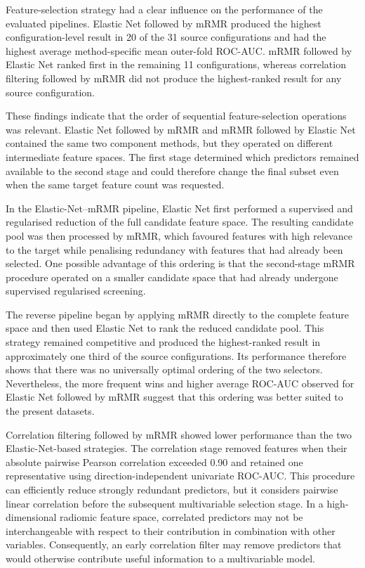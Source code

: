 \documentclass[12pt,twocolumn]{article}
\begin{document}
Feature-selection strategy had a clear influence on the performance
of the evaluated pipelines. Elastic Net followed by mRMR produced the
highest configuration-level result in 20 of the 31 source
configurations and had the highest average method-specific mean
outer-fold ROC-AUC. mRMR followed by Elastic Net ranked first in the
remaining 11 configurations, whereas correlation filtering followed
by mRMR did not produce the highest-ranked result for any source
configuration.

These findings indicate that the order of sequential feature-selection
operations was relevant. Elastic Net followed by mRMR and mRMR
followed by Elastic Net contained the same two component methods, but
they operated on different intermediate feature spaces. The first
stage determined which predictors remained available to the second
stage and could therefore change the final subset even when the same
target feature count was requested.

In the Elastic-Net--mRMR pipeline, Elastic Net first performed a
supervised and regularised reduction of the full candidate feature
space. The resulting candidate pool was then processed by mRMR, which
favoured features with high relevance to the target while penalising
redundancy with features that had already been selected. One possible
advantage of this ordering is that the second-stage mRMR procedure
operated on a smaller candidate space that had already undergone
supervised regularised screening.

The reverse pipeline began by applying mRMR directly to the complete
feature space and then used Elastic Net to rank the reduced candidate
pool. This strategy remained competitive and produced the
highest-ranked result in approximately one third of the source
configurations. Its performance therefore shows that there was no
universally optimal ordering of the two selectors. Nevertheless, the
more frequent wins and higher average ROC-AUC observed for
Elastic Net followed by mRMR suggest that this ordering was better
suited to the present datasets.

Correlation filtering followed by mRMR showed lower performance than
the two Elastic-Net-based strategies. The correlation stage removed
features when their absolute pairwise Pearson correlation exceeded
0.90 and retained one representative using direction-independent
univariate ROC-AUC. This procedure can efficiently reduce strongly
redundant predictors, but it considers pairwise linear correlation
before the subsequent multivariable selection stage. In a
high-dimensional radiomic feature space, correlated predictors may
not be interchangeable with respect to their contribution in
combination with other variables. Consequently, an early correlation
filter may remove predictors that would otherwise contribute useful
information to a multivariable model.
\end{document}
